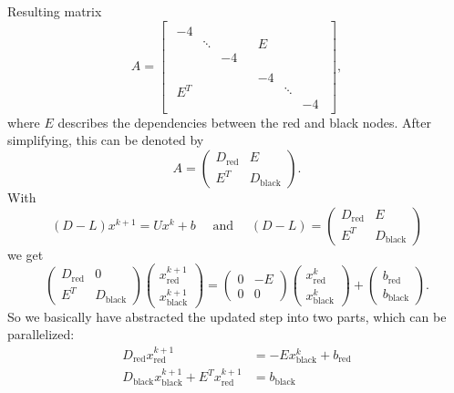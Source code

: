 Resulting matrix
\[
A = \begin{bmatrix}
\begin{matrix}
-4\\
& \ddots \\
&& -4
\end{matrix}
&
\begin{matrix}
	E
\end{matrix}
\\
\begin{matrix}
	E^{T}
\end{matrix}
&
\begin{matrix}
-4\\
& \ddots \\
&& -4
\end{matrix}
\end{bmatrix}
,\] 
where $E$ describes the dependencies between the red and black nodes.
After simplifying, this can be denoted by
\[
A = \begin{pmatrix}
	D_{\text{red}} & E \\
	E^{T} & D_{\text{black}}
\end{pmatrix}
.\] 
With
\[
	(D-L) x^{k+1} = Ux^{k}+b \quad \text{ and } \quad (D-L) = \begin{pmatrix}
	D_{\text{red}} & E \\
	E^{T} & D_{\text{black}}
	\end{pmatrix}
\] 
we get
\[
\begin{pmatrix}
	D_{\text{red}} & 0 \\
	E^{T} & D_{\text{black}}
\end{pmatrix}
\begin{pmatrix}
x^{k+1}_{\text{red}} \\
x^{k+1}_{\text{black}}
\end{pmatrix}
=
\begin{pmatrix}
	0 & -E \\
	0 & 0
\end{pmatrix}
\begin{pmatrix}
x^{k}_{\text{red}} \\
x^{k}_{\text{black}}
\end{pmatrix}
+
\begin{pmatrix}
b_{\text{red}} \\
b_{\text{black}}
\end{pmatrix}
.\] 
So we basically have abstracted the updated step into two parts, which can be parallelized:
\begin{align*}
	D_{\text{red}}x_{\text{red}}^{k+1} &= -E x_{\text{black}}^{k} + b_{\text{red}} \\
	D_{\text{black}}x_{\text{black}}^{k+1} + E^{T} x_{\text{red}}^{k+1} &= b_{\text{black}}
\end{align*}
